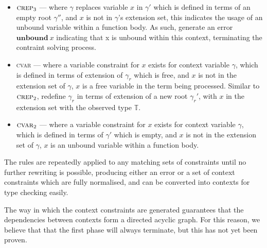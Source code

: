 \documentclass{article}
\begin{document}
\begin{itemize}
\item $\textsc{crep}_3$ --- where $\gamma$ replaces variable $x$ in
$\gamma'$ which is defined in terms of an empty root $\gamma''$,
and $x$ is not in $\gamma$'s extension set, this indicates the usage
of an unbound variable within a function body. As such, generate an
error $\mathbf{unbound}\:x$ indicating that x is unbound within this
context, terminating the contraint solving process.
\item \textsc{cvar} --- where a variable constraint for $x$ exists
for context variable $\gamma$, which is defined in terms of
extension of $\gamma_r$ which is free, and $x$ is not in the extension
set of $\gamma$, $x$ is a free variable in the term being processed. 
Similar to $\textsc{crep}_2$, redefine $\gamma_r$
in terms of extension of a new root $\gamma_r'$, with $x$ in
the extension set with the observed type $\mathbb{T}$.
\item $\textsc{cvar}_2$ --- where a variable constraint for $x$ exists
for context variable $\gamma$, which is defined in terms of $\gamma'$
which is empty, and $x$ is not in the extension set of $\gamma$, 
$x$ is an unbound variable within a function body.
\end{itemize}

The rules are repeatedly applied to any matching sets of constraints
until no further rewriting is possible, producing either an error
or a set of context constraints which are fully normalised, and
can be converted into contexts for type checking easily.

The way in which the context constraints are generated guarantees
that the dependencies between contexts form a directed acyclic graph. For
this reason, we believe that that the first phase will always terminate,
but this has not yet been proven.
\end{document}

